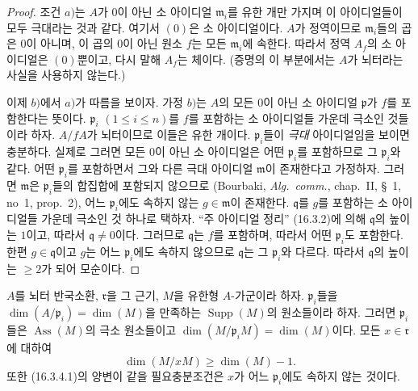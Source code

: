 \begin{proof}
조건 $a)$는 $A$가 $0$이 아닌 소 아이디얼
$\mathfrak{m}_i$를 유한 개만 가지며 이 아이디얼들이 모두
극대라는 것과 같다. 여기서 $(0)$은 소 아이디얼이다. $A$가
정역이므로 $\mathfrak{m}_i$들의 곱은 $0$이 아니며, 이 곱의
$0$이 아닌 원소 $f$는 모든 $\mathfrak{m}_i$에 속한다. 따라서
정역 $A_f$의 소 아이디얼은 $(0)$뿐이고, 다시 말해 $A_f$는 체이다.
(증명의 이 부분에서는 $A$가 뇌터라는 사실을 사용하지 않는다.)

이제 $b)$에서 $a)$가 따름을 보이자. 가정 $b)$는 $A$의 모든
$0$이 아닌 소 아이디얼 $\mathfrak{p}$가 $f$를 포함한다는 뜻이다.
$\mathfrak{p}_i$ $(1\leq i\leq n)$를 $f$를 포함하는 소
아이디얼들 가운데 극소인 것들이라 하자. $A/fA$가 뇌터이므로 이들은
유한 개이다. $\mathfrak{p}_i$들이 \emph{극대} 아이디얼임을 보이면
충분하다. 실제로 그러면 모든 $0$이 아닌 소 아이디얼은 어떤
$\mathfrak{p}_i$를 포함하므로 그 $\mathfrak{p}_i$와 같다.
어떤 $\mathfrak{p}_i$를 포함하면서 그와 다른 극대 아이디얼
$\mathfrak{m}$이 존재한다고 가정하자. 그러면 $\mathfrak{m}$은
$\mathfrak{p}_i$들의 합집합에 포함되지 않으므로 (Bourbaki,
\emph{Alg.~comm.}, chap.~II, \S~1, no~1, prop.~2), 어느
$\mathfrak{p}_i$에도 속하지 않는 $g\in\mathfrak{m}$이 존재한다.
$\mathfrak{q}$를 $g$를 포함하는 소 아이디얼들 가운데 극소인 것
하나로 택하자. ``주 아이디얼 정리'' (16.3.2)에 의해
$\mathfrak{q}$의 높이는 $1$이고, 따라서 $\mathfrak{q}\neq0$이다.
그러므로 $\mathfrak{q}$는 $f$를 포함하며, 따라서 어떤
$\mathfrak{p}_i$도 포함한다. 한편 $g\in\mathfrak{q}$이고 $g$는
어느 $\mathfrak{p}_i$에도 속하지 않으므로 $\mathfrak{q}$는 그
$\mathfrak{p}_i$와 다르다. 따라서 $\mathfrak{q}$의 높이는
$\geq2$가 되어 모순이다.
\end{proof}

\begin{proposition}[16.3.4]
\label{0.16.3.4-fr}
$A$를 뇌터 반국소환, $\mathfrak{r}$을 그 근기, $M$을 유한형
$A$-가군이라 하자. $\mathfrak{p}_i$들을
$\dim(A/\mathfrak{p}_i)=\dim(M)$을 만족하는
$\operatorname{Supp}(M)$의 원소들이라 하자. 그러면
$\mathfrak{p}_i$들은 $\operatorname{Ass}(M)$의 극소 원소들이고
$\dim(M/\mathfrak{p}_iM)=\dim(M)$이다. 모든
$x\in\mathfrak{r}$에 대하여
\begin{equation}
\label{0.16.3.4.1-fr}
\tag{16.3.4.1}
  \dim(M/xM)\geq\dim(M)-1.
\end{equation}
또한 (16.3.4.1)의 양변이 같을 필요충분조건은 $x$가 어느
$\mathfrak{p}_i$에도 속하지 않는 것이다.
\end{proposition}

